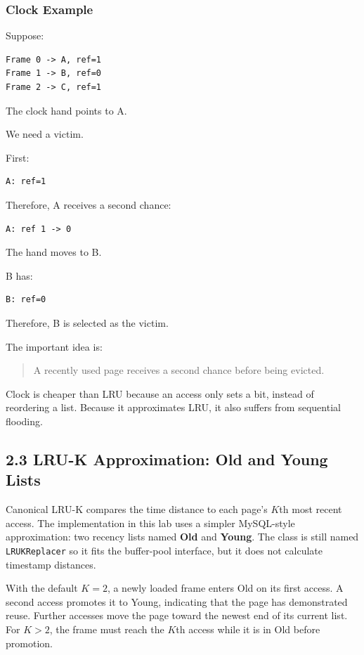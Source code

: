 \documentclass[12pt,a4paper]{article}
\begin{document}
\subsubsection{Clock Example}

Suppose:

\begin{verbatim}
Frame 0 -> A, ref=1
Frame 1 -> B, ref=0
Frame 2 -> C, ref=1
\end{verbatim}

The clock hand points to A.

We need a victim.

First:

\begin{verbatim}
A: ref=1
\end{verbatim}

Therefore, A receives a second chance:

\begin{verbatim}
A: ref 1 -> 0
\end{verbatim}

The hand moves to B.

B has:

\begin{verbatim}
B: ref=0
\end{verbatim}

Therefore, B is selected as the victim.

The important idea is:

\begin{quote}
A recently used page receives a second chance before being evicted.
\end{quote}

Clock is cheaper than LRU because an access only sets a bit, instead of reordering a list.
Because it approximates LRU, it also suffers from sequential flooding.

\subsection{2.3 LRU-K Approximation: Old and Young Lists}

Canonical LRU-K compares the time distance to each page's $K$th most recent access. The
implementation in this lab uses a simpler MySQL-style approximation: two recency lists named
\textbf{Old} and \textbf{Young}. The class is still named \texttt{LRUKReplacer} so it fits the
buffer-pool interface, but it does not calculate timestamp distances.

With the default $K=2$, a newly loaded frame enters Old on its first access. A second access
promotes it to Young, indicating that the page has demonstrated reuse. Further accesses move the
page toward the newest end of its current list. For $K>2$, the frame must reach the $K$th access
while it is in Old before promotion.
\end{document}
